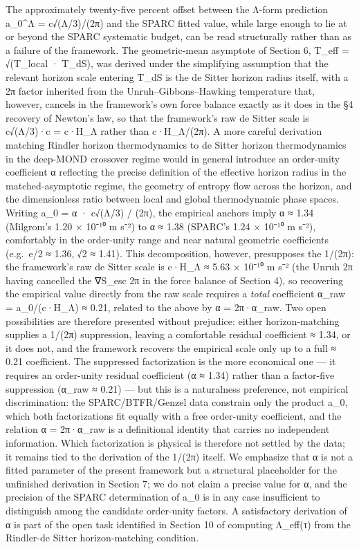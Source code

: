 \documentclass[11pt]{article}
\begin{document}
The approximately twenty-five percent offset between the Λ-form prediction a\_0\^{}Λ = c√(Λ/3)/(2π) and the SPARC fitted value, while large enough to lie at or beyond the SPARC systematic budget, can be read structurally rather than as a failure of the framework. The geometric-mean asymptote of Section 6, T\_eff = √(T\_local · T\_dS), was derived under the simplifying assumption that the relevant horizon scale entering T\_dS is the de Sitter horizon radius itself, with a 2π factor inherited from the Unruh--Gibbons--Hawking temperature that, however, cancels in the framework's own force balance exactly as it does in the §4 recovery of Newton's law, so that the framework's raw de Sitter scale is c√(Λ/3)·c = c·H\_Λ rather than c·H\_Λ/(2π). A more careful derivation matching Rindler horizon thermodynamics to de Sitter horizon thermodynamics in the deep-MOND crossover regime would in general introduce an order-unity coefficient α reflecting the precise definition of the effective horizon radius in the matched-asymptotic regime, the geometry of entropy flow across the horizon, and the dimensionless ratio between local and global thermodynamic phase spaces. Writing a\_0 = α · c√(Λ/3) / (2π), the empirical anchors imply α ≈ 1.34 (Milgrom's 1.20 × 10⁻¹⁰ m s⁻²) to α ≈ 1.38 (SPARC's 1.24 × 10⁻¹⁰ m s⁻²), comfortably in the order-unity range and near natural geometric coefficients (e.g.~e/2 ≈ 1.36, √2 ≈ 1.41). This decomposition, however, presupposes the 1/(2π): the framework's raw de Sitter scale is c·H\_Λ ≈ 5.63 × 10⁻¹⁰ m s⁻² (the Unruh 2π having cancelled the ∇S\_esc 2π in the force balance of Section 4), so recovering the empirical value directly from the raw scale requires a \emph{total} coefficient α\_raw = a\_0/(c·H\_Λ) ≈ 0.21, related to the above by α = 2π·α\_raw. Two open possibilities are therefore presented without prejudice: either horizon-matching supplies a 1/(2π) suppression, leaving a comfortable residual coefficient ≈ 1.34, or it does not, and the framework recovers the empirical scale only up to a full ≈ 0.21 coefficient. The suppressed factorization is the more economical one --- it requires an order-unity residual coefficient (α ≈ 1.34) rather than a factor-five suppression (α\_raw ≈ 0.21) --- but this is a naturalness preference, not empirical discrimination: the SPARC/BTFR/Genzel data constrain only the product a\_0, which both factorizations fit equally with a free order-unity coefficient, and the relation α = 2π·α\_raw is a definitional identity that carries no independent information. Which factorization is physical is therefore not settled by the data; it remains tied to the derivation of the 1/(2π) itself. We emphasize that α is not a fitted parameter of the present framework but a structural placeholder for the unfinished derivation in Section 7; we do not claim a precise value for α, and the precision of the SPARC determination of a\_0 is in any case insufficient to distinguish among the candidate order-unity factors. A satisfactory derivation of α is part of the open task identified in Section 10 of computing Λ\_eff(τ) from the Rindler-de Sitter horizon-matching condition.
\end{document}
